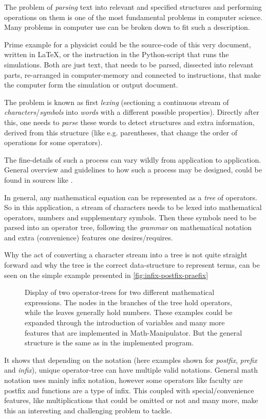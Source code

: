 The problem of \emph{parsing} text into relevant and specified structures and performing operations on them is one of the most fundamental problems in computer science. 
Many problems in computer use can be broken down to fit such a description.

Prime example for a physicist could be the source-code of this very document, written in \LaTeX, or the instruction in the Python-script that runs the simulations. 
Both are just text, that needs to be parsed, dissected into relevant parts, re-arranged in computer-memory and connected to instructions, that make the computer form the simulation or output document.

The problem is known as first \emph{lexing} (sectioning a continuous stream of \emph{characters}/\emph{symbols} into \emph{words} with a different possible properties).
Directly after this, one needs to \emph{parse} these words to detect structures and extra information, derived from this structure (like e.g. parentheses, that change the order of operations for some operators).

The fine-details of such a process can vary wildly from application to application. 
General overview and guidelines to how such a process may be designed, could be found in sources like \cite{compilersDragonBook}.

In general, any mathematical equation can be represented as a \emph{tree} of operators.
So in this application, a stream of characters needs to be lexed into mathematical operators, numbers and supplementary symbols.
Then these symbols need to be parsed into an operator tree, following the \emph{grammar} on mathematical notation and extra (convenience) features one desires/requires. 

Why the act of converting a character stream into a tree is not quite straight forward and why the tree is the correct data-structure to represent terms, can be seen on the simple example presented in \autoref{fig:infix-postfix-praefix}

\begin{figure}[htbp]
            
    \vspace{0.8cm}
    \caption{Display of two operator-trees for two different mathematical expressions. 
    The nodes in the branches of the tree hold operators, while the leaves generally hold numbers. These examples could be expanded through the introduction of variables and many more features that are implemented in Math-Manipulator. But the general structure is the same as in the implemented program.}
    \label{fig:infix-postfix-praefix}
\end{figure}

It shows that depending on the notation (here examples shown for \emph{postfix}, \emph{prefix} and \emph{infix}), unique operator-tree can have multiple valid notations. 
General math notation uses mainly infix notation, however some operators like faculty are postfix and functions are a type of infix.
This coupled with special/convenience features, like multiplications that could be omitted or not and many more, make this an interesting and challenging problem to tackle.